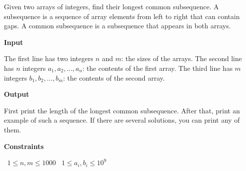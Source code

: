 Given two arrays of integers, find their longest common subsequence.
A subsequence is a sequence of array elements from left to right that can contain gaps. A common subsequence is a subsequence that appears in both arrays.

\vspace{0.3cm}\noindent\textbf{Input}

The first line has two integers $n$ and $m$: the sizes of the arrays.
The second line has $n$ integers $a_1,a_2,\dots,a_n$: the contents of the first array.
The third line has $m$ integers $b_1,b_2,\dots,b_m$: the contents of the second array.

\vspace{0.3cm}\noindent\textbf{Output}

First print the length of the longest common subsequence.
After that, print an example of such a sequence. If there are several solutions, you can print any of them.

\vspace{0.3cm}\noindent\textbf{Constraints}

\textbullet\ $1 \le n,m \le 1000$
\textbullet\ $1 \le a_i, b_i \le 10^9$